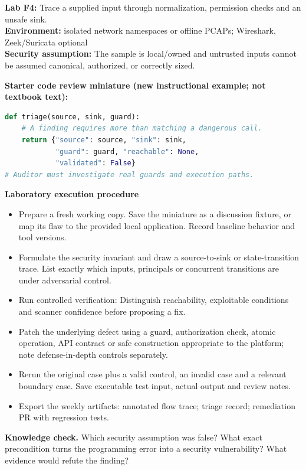 \documentclass[10pt,letterpaper]{article}
\begin{document}
\begin{insight}\textbf{Lab F4:} Trace a supplied input through normalization, permission checks and an unsafe sink.\\\textbf{Environment:} isolated network namespaces or offline PCAPs; Wireshark, Zeek/Suricata optional\\\textbf{Security assumption:} The sample is local/owned and untrusted inputs cannot be assumed canonical, authorized, or correctly sized.\end{insight}
\textbf{Starter code review miniature (new instructional example; not textbook text):}
\begin{lstlisting}[language=Python]
def triage(source, sink, guard):
    # A finding requires more than matching a dangerous call.
    return {"source": source, "sink": sink,
            "guard": guard, "reachable": None,
            "validated": False}
# Auditor must investigate real guards and execution paths.
\end{lstlisting}
\textbf{Laboratory execution procedure}
\begin{itemize}[leftmargin=*,itemsep=2pt]
\item Prepare a fresh working copy. Save the miniature as a discussion fixture, or map its flaw to the provided local application. Record baseline behavior and tool versions.
\item Formulate the security invariant and draw a source-to-sink or state-transition trace. List exactly which inputs, principals or concurrent transitions are under adversarial control.
\item Run controlled verification: Distinguish reachability, exploitable conditions and scanner confidence before proposing a fix.
\item Patch the underlying defect using a guard, authorization check, atomic operation, API contract or safe construction appropriate to the platform; note defense-in-depth controls separately.
\item Rerun the original case plus a valid control, an invalid case and a relevant boundary case. Save executable test input, actual output and review notes.
\item Export the weekly artifacts: annotated flow trace; triage record; remediation PR with regression tests.
\end{itemize}
\textbf{Knowledge check.} Which security assumption was false? What exact precondition turns the programming error into a security vulnerability? What evidence would refute the finding?
\end{document}
